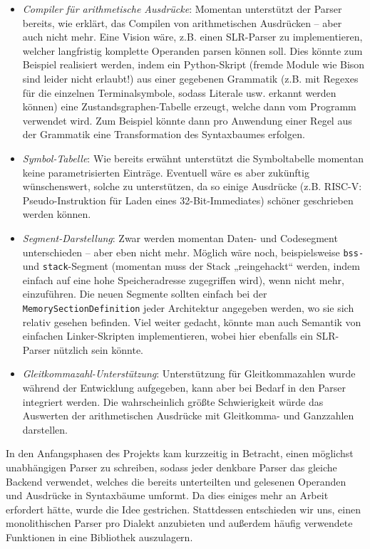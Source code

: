 \begin{itemize} \item \emph{Compiler für arithmetische Ausdrücke}: Momentan
unterstützt der Parser bereits, wie erklärt, das Compilen von arithmetischen
Ausdrücken – aber auch nicht mehr. Eine Vision wäre, z.B. einen SLR-Parser zu
implementieren, welcher langfristig komplette Operanden parsen können soll. Dies
könnte zum Beispiel realisiert werden, indem ein Python-Skript (fremde Module
wie Bison sind leider nicht erlaubt!) aus einer gegebenen Grammatik (z.B. mit
Regexes für die einzelnen Terminalsymbole, sodass Literale usw. erkannt werden
können) eine Zustandsgraphen-Tabelle erzeugt, welche dann vom Programm verwendet
wird. Zum Beispiel könnte dann pro Anwendung einer Regel aus der Grammatik eine
Transformation des Syntaxbaumes erfolgen. \item \emph{Symbol-Tabelle}: Wie
bereits erwähnt unterstützt die Symboltabelle momentan keine parametrisierten
Einträge. Eventuell wäre es aber zukünftig wünschenswert, solche zu
unterstützen, da so einige Ausdrücke (z.B. RISC-V: Pseudo-Instruktion für Laden
eines 32-Bit-Immediates) schöner geschrieben werden können. \item
\emph{Segment-Darstellung}: Zwar werden momentan Daten- und Codesegment
unterschieden – aber eben nicht mehr. Möglich wäre noch, beispielsweise
\texttt{bss-} und \texttt{stack}-Segment (momentan muss der Stack „reingehackt“
werden, indem einfach auf eine hohe Speicheradresse zugegriffen wird), wenn
nicht mehr, einzuführen. Die neuen Segmente sollten einfach bei der
\texttt{MemorySectionDefinition} jeder Architektur angegeben werden, wo sie sich
relativ gesehen befinden. Viel weiter gedacht, könnte man auch Semantik von
einfachen Linker-Skripten implementieren, wobei hier ebenfalls ein SLR-Parser
nützlich sein könnte. \item \emph{Gleitkommazahl-Unterstützung}: Unterstützung
für Gleitkommazahlen wurde während der Entwicklung aufgegeben, kann aber bei
Bedarf in den Parser integriert werden. Die wahrscheinlich größte Schwierigkeit
würde das Auswerten der arithmetischen Ausdrücke mit Gleitkomma- und Ganzzahlen
darstellen. \end{itemize}

In den Anfangsphasen des Projekts kam kurzzeitig in Betracht, einen möglichst
unabhängigen Parser zu schreiben, sodass jeder denkbare Parser das gleiche
Backend verwendet, welches die bereits unterteilten und gelesenen Operanden und
Ausdrücke in Syntaxbäume umformt. Da dies einiges mehr an Arbeit erfordert
hätte, wurde die Idee gestrichen. Stattdessen entschieden wir uns, einen
monolithischen Parser pro Dialekt anzubieten und außerdem häufig verwendete
Funktionen in eine Bibliothek auszulagern.

